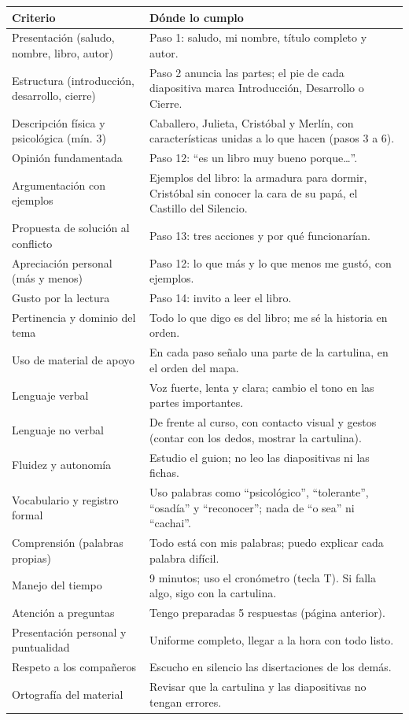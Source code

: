 \documentclass[12pt,a4paper]{article}
\begin{document}
\begin{longtable}{p{5.4cm} p{10.2cm}}
\textbf{Criterio} & \textbf{Dónde lo cumplo} \\ \hline
\endhead
Presentación (saludo, nombre, libro, autor) & Paso 1: saludo, mi nombre, título completo y autor. \\
Estructura (introducción, desarrollo, cierre) & Paso 2 anuncia las partes; el pie de cada diapositiva marca Introducción, Desarrollo o Cierre. \\
Descripción física y psicológica (mín. 3) & Caballero, Julieta, Cristóbal y Merlín, con características unidas a lo que hacen (pasos 3 a 6). \\
Opinión fundamentada & Paso 12: “es un libro muy bueno porque…”. \\
Argumentación con ejemplos & Ejemplos del libro: la armadura para dormir, Cristóbal sin conocer la cara de su papá, el Castillo del Silencio. \\
Propuesta de solución al conflicto & Paso 13: tres acciones y por qué funcionarían. \\
Apreciación personal (más y menos) & Paso 12: lo que más y lo que menos me gustó, con ejemplos. \\
Gusto por la lectura & Paso 14: invito a leer el libro. \\
Pertinencia y dominio del tema & Todo lo que digo es del libro; me sé la historia en orden. \\
Uso de material de apoyo & En cada paso señalo una parte de la cartulina, en el orden del mapa. \\
Lenguaje verbal & Voz fuerte, lenta y clara; cambio el tono en las partes importantes. \\
Lenguaje no verbal & De frente al curso, con contacto visual y gestos (contar con los dedos, mostrar la cartulina). \\
Fluidez y autonomía & Estudio el guion; no leo las diapositivas ni las fichas. \\
Vocabulario y registro formal & Uso palabras como “psicológico”, “tolerante”, “osadía” y “reconocer”; nada de “o sea” ni “cachai”. \\
Comprensión (palabras propias) & Todo está con mis palabras; puedo explicar cada palabra difícil. \\
Manejo del tiempo & 9 minutos; uso el cronómetro (tecla T). Si falla algo, sigo con la cartulina. \\
Atención a preguntas & Tengo preparadas 5 respuestas (página anterior). \\
Presentación personal y puntualidad & Uniforme completo, llegar a la hora con todo listo. \\
Respeto a los compañeros & Escucho en silencio las disertaciones de los demás. \\
Ortografía del material & Revisar que la cartulina y las diapositivas no tengan errores. \\
\end{longtable}
\end{document}
